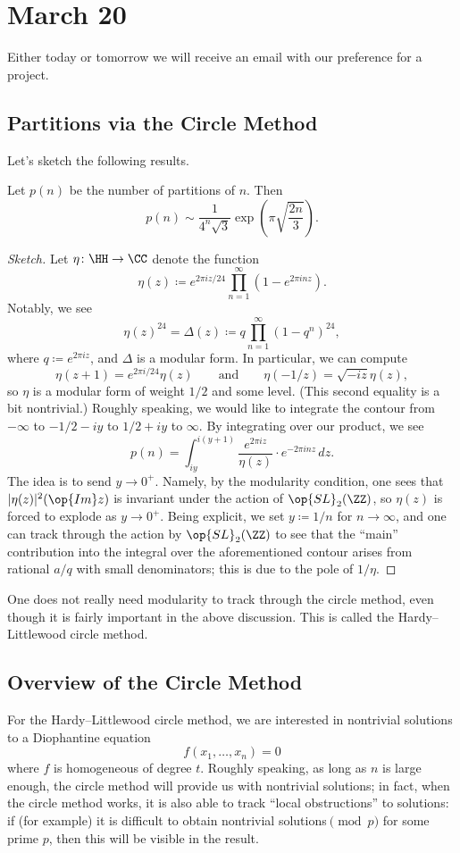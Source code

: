 \documentclass[../notes.tex]{subfiles}
\begin{document}
\section{March 20}

Either today or tomorrow we will receive an email with our preference for a project.

\subsection{Partitions via the Circle Method}
Let's sketch the following results.
\begin{theorem}
	Let $p(n)$ be the number of partitions of $n$. Then
	\[p(n)\sim\frac1{4^n\sqrt3}\exp\left(\pi\sqrt{\frac{2n}3}\right).\]
\end{theorem}
\begin{proof}[Sketch]
	Let $\eta\colon\HH\to\CC$ denote the function
	\[\eta(z)\coloneqq e^{2\pi iz/24}\prod_{n=1}^\infty\left(1-e^{2\pi inz}\right).\]
	Notably, we see
	\[\eta(z)^{24}=\Delta(z)\coloneqq q\prod_{n=1}^\infty\left(1-q^n\right)^{24},\]
	where $q\coloneqq e^{2\pi iz}$, and $\Delta$ is a modular form. In particular, we can compute
	\[\eta(z+1)=e^{2\pi i/24}\eta(z)\qquad\text{and}\qquad\eta(-1/z)=\sqrt{-iz}\eta(z),\]
	so $\eta$ is a modular form of weight $1/2$ and some level. (This second equality is a bit nontrivial.) Roughly speaking, we would like to integrate the contour from $-\infty$ to $-1/2-iy$ to $1/2+iy$ to $\infty$. By integrating over our product, we see
	\[p(n)=\int_{iy}^{i(y+1)}\frac{e^{2\pi iz}}{\eta(z)}\cdot e^{-2\pi inz}\,dz.\]
	The idea is to send $y\to0^+$. Namely, by the modularity condition, one sees that $|\eta(z)|^2(\op{Im}z)$ is invariant under the action of $\op{SL}_2(\ZZ)$, so $\eta(z)$ is forced to explode as $y\to0^+$. Being explicit, we set $y\coloneqq1/n$ for $n\to\infty$, and one can track through the action by $\op{SL}_2(\ZZ)$ to see that the ``main'' contribution into the integral over the aforementioned contour arises from rational $a/q$ with small denominators; this is due to the pole of $1/\eta$.
\end{proof}
\begin{remark}
	One does not really need modularity to track through the circle method, even though it is fairly important in the above discussion. This is called the Hardy--Littlewood circle method.
\end{remark}

\subsection{Overview of the Circle Method}
For the Hardy--Littlewood circle method, we are interested in nontrivial solutions to a Diophantine equation
\[f(x_1,\ldots,x_n)=0\]
where $f$ is homogeneous of degree $t$. Roughly speaking, as long as $n$ is large enough, the circle method will provide us with nontrivial solutions; in fact, when the circle method works, it is also able to track ``local obstructions'' to solutions: if (for example) it is difficult to obtain nontrivial solutions$\pmod p$ for some prime $p$, then this will be visible in the result.
\end{document}
